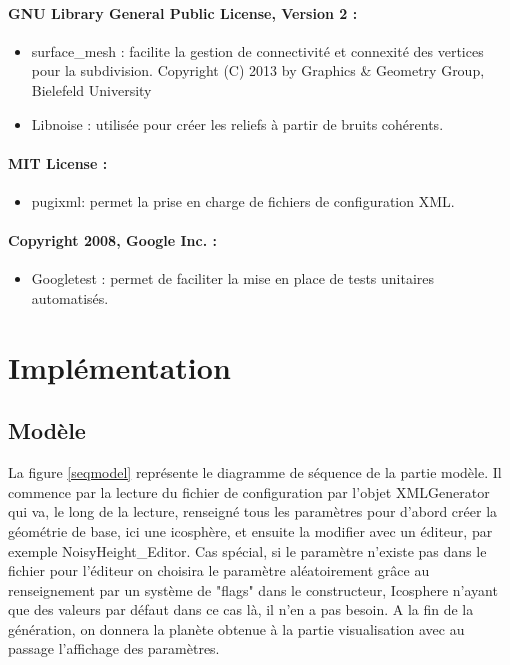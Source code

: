 \documentclass[a4paper]{article}
\begin{document}
\paragraph{GNU Library General Public License, Version 2 : }
\begin{itemize}
\item surface\_mesh :
    facilite la gestion de connectivité et connexité des vertices pour la subdivision. Copyright (C) 2013 by Graphics \& Geometry Group, Bielefeld University
\item Libnoise :
    utilisée pour créer les reliefs à partir de bruits cohérents.
\end{itemize}

\paragraph{MIT License :}
\begin{itemize}
\item pugixml:
    permet la prise en charge de fichiers de configuration XML.
\end{itemize}

\paragraph{Copyright 2008, Google Inc. :}
\begin{itemize}
\item Googletest :
    permet de faciliter la mise en place de tests unitaires automatisés.
\end{itemize}

\newpage 
\section{Implémentation}

\subsection{Modèle}

La figure \ref{seqmodel} représente le diagramme de séquence de la partie modèle. 
Il commence par la lecture du fichier de configuration par l'objet XMLGenerator qui va, le long de la lecture, renseigné tous les paramètres pour d'abord créer la géométrie de base, ici une icosphère, et ensuite la modifier avec un éditeur, par exemple NoisyHeight\_Editor. Cas spécial, si le paramètre n'existe pas dans le fichier pour l'éditeur on choisira le paramètre aléatoirement grâce au renseignement par un système de "flags" dans le constructeur, Icosphere n'ayant que des valeurs par défaut dans ce cas là, il n'en a pas besoin. A la fin de la génération, on donnera la planète obtenue à la partie visualisation avec au passage l'affichage des paramètres.\\
\end{document}
